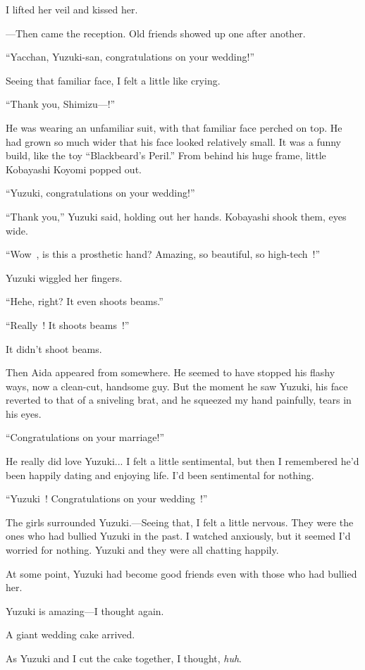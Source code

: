 \documentclass[
    a4paper,
    12pt,
    twoside,
    openany,
    UTF8,
    fontset=windows
]{ctexbook}
\begin{document}
I lifted her veil and kissed her.

---Then came the reception. Old friends showed up one after another.

``Yacchan, Yuzuki-san, congratulations on your wedding!''

Seeing that familiar face, I felt a little like crying.

``Thank you, Shimizu---!''

He was wearing an unfamiliar suit, with that familiar face perched on top. He had grown so much wider that his face looked relatively small. It was a funny build, like the toy ``Blackbeard's Peril.'' From behind his huge frame, little Kobayashi Koyomi popped out.

``Yuzuki, congratulations on your wedding!''

``Thank you,'' Yuzuki said, holding out her hands. Kobayashi shook them, eyes wide.

``Wow~, is this a prosthetic hand? Amazing, so beautiful, so high-tech~!''

Yuzuki wiggled her fingers.

``Hehe, right? It even shoots beams.''

``Really~! It shoots beams~!''

It didn't shoot beams.

Then Aida appeared from somewhere. He seemed to have stopped his flashy ways, now a clean-cut, handsome guy. But the moment he saw Yuzuki, his face reverted to that of a sniveling brat, and he squeezed my hand painfully, tears in his eyes.

``Congratulations on your marriage!''

He really did love Yuzuki... I felt a little sentimental, but then I remembered he'd been happily dating and enjoying life. I'd been sentimental for nothing.

``Yuzuki~! Congratulations on your wedding~!''

The girls surrounded Yuzuki.---Seeing that, I felt a little nervous. They were the ones who had bullied Yuzuki in the past. I watched anxiously, but it seemed I'd worried for nothing. Yuzuki and they were all chatting happily.

At some point, Yuzuki had become good friends even with those who had bullied her.

Yuzuki is amazing---I thought again.

A giant wedding cake arrived.

As Yuzuki and I cut the cake together, I thought, \emph{huh}.
\end{document}
